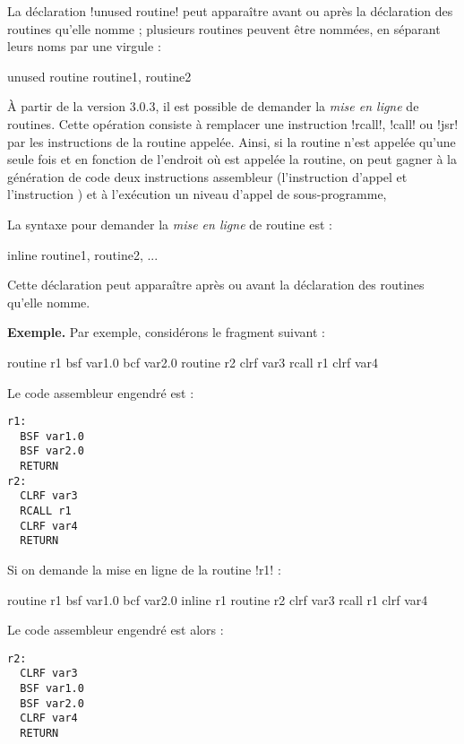 La déclaration \pic!unused routine! peut apparaître avant ou après la déclaration des routines qu'elle nomme ; plusieurs routines peuvent être nommées, en séparant leurs noms par une virgule :
\begin{piccolo}
unused routine routine1, routine2
\end{piccolo}







À partir de la version 3.0.3, il est possible de demander la \emph{mise en ligne} de routines. Cette opération consiste à remplacer une instruction \pic!rcall!, \pic!call! ou \pic!jsr! par les instructions de la routine appelée. Ainsi, si la routine n'est appelée qu'une seule fois et en fonction de l'endroit où est appelée la routine, on peut gagner à la génération de code deux instructions assembleur (l'instruction d'appel et l'instruction ) et à l'exécution un niveau d'appel de sous-programme, 

La syntaxe pour demander la \emph{mise en ligne} de routine est :
\begin{piccolo}
inline routine1, routine2, ...
\end{piccolo}

Cette déclaration peut apparaître après ou avant la déclaration des routines qu'elle nomme.

\textbf{Exemple.} Par exemple, considérons le fragment suivant :
\begin{piccolo}
routine r1 {
  bsf var1.0
  bcf var2.0
}
routine r2 {
  clrf var3
  rcall r1
  clrf var4
}
\end{piccolo}

Le code assembleur engendré est :
\begin{lstlisting}[language=assembleur]
r1:
  BSF var1.0
  BSF var2.0
  RETURN
r2:
  CLRF var3
  RCALL r1
  CLRF var4
  RETURN
\end{lstlisting}


Si on demande la mise en ligne de la routine \pic!r1! :
\begin{piccolo}
routine r1 {
  bsf var1.0
  bcf var2.0
}
inline r1
routine r2 {
  clrf var3
  rcall r1
  clrf var4
}
\end{piccolo}

Le code assembleur engendré est alors :
\begin{lstlisting}[language=assembleur]
r2:
  CLRF var3
  BSF var1.0
  BSF var2.0
  CLRF var4
  RETURN
\end{lstlisting}

